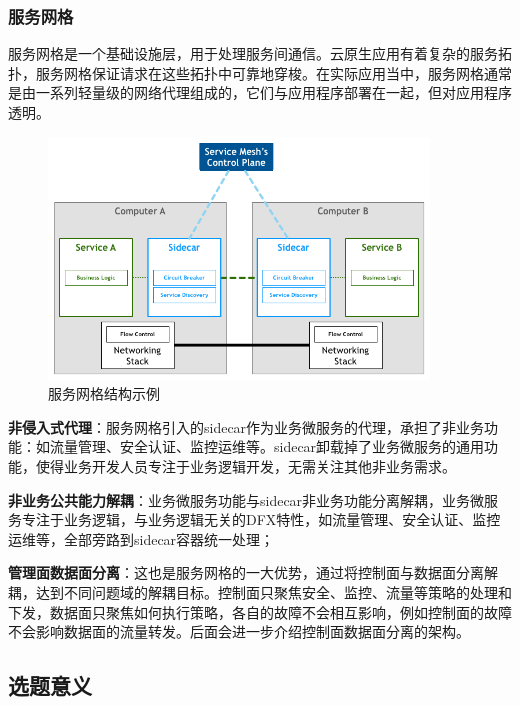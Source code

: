 \subsubsection{服务网格}

服务网格是一个基础设施层，用于处理服务间通信。云原生应用有着复杂的服务拓扑，服务网格保证请求在这些拓扑中可靠地穿梭。在实际应用当中，服务网格通常是由一系列轻量级的网络代理组成的，它们与应用程序部署在一起，但对应用程序透明。\par


\begin{figure}[H]
    \centering
    \includegraphics[width=0.9\textwidth]{Img/service mesh.png}
    \caption{服务网格结构示例}
    \label{fig:service_mesh}
\end{figure}

\textbf{非侵入式代理}：服务网格引入的sidecar作为业务微服务的代理，承担了非业务功能：如流量管理、安全认证、监控运维等。sidecar卸载掉了业务微服务的通用功能，使得业务开发人员专注于业务逻辑开发，无需关注其他非业务需求。\par
\textbf{非业务公共能力解耦}：业务微服务功能与sidecar非业务功能分离解耦，业务微服务专注于业务逻辑，与业务逻辑无关的DFX特性，如流量管理、安全认证、监控运维等，全部旁路到sidecar容器统一处理；\par
\textbf{管理面数据面分离}：这也是服务网格的一大优势，通过将控制面与数据面分离解耦，达到不同问题域的解耦目标。控制面只聚焦安全、监控、流量等策略的处理和下发，数据面只聚焦如何执行策略，各自的故障不会相互影响，例如控制面的故障不会影响数据面的流量转发。后面会进一步介绍控制面数据面分离的架构。\par


\subsection{选题意义}

